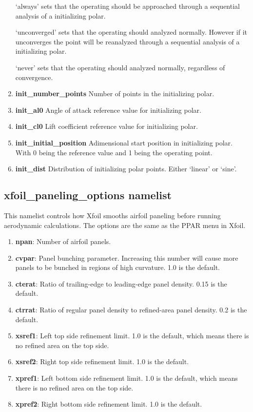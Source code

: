 \documentclass[11pt]{article}
\begin{document}
\begin{enumerate}
{	`always' sets that the operating should be approached through a sequential analysis of a initializing polar.
	
	`unconverged' sets that the operating should analyzed normally. However if it unconverges the point will be reanalyzed through a sequential analysis of a initializing polar.
	
	`never' sets that the operating should analyzed normally, regardless of convergence.}

\item{\textbf{init\_number\_points} Number of points in the initializing polar.}
\item{\textbf{init\_al0} Angle of attack reference value for initializing polar.}
\item{\textbf{init\_cl0} Lift coefficient reference value for initializing polar.}
\item{\textbf{init\_initial\_position} Adimensional start position in initializing polar. With 0 being the reference value and 1 being the operating point.}
\item{\textbf{init\_dist} Distribution of initializing polar points. Either `linear' or `sine'.}
\end{enumerate}

\subsection{xfoil\_paneling\_options namelist}

This namelist controls how Xfoil smooths airfoil paneling before running aerodynamic
calculations.  The options are the same as the PPAR menu in Xfoil.

\begin{enumerate}
\item{\textbf{npan}: Number of airfoil panels.}
\item{\textbf{cvpar}: Panel bunching parameter.  Increasing this number will cause more
panels to be bunched in regions of high curvature. 1.0 is the default.}
\item{\textbf{cterat}: Ratio of trailing-edge to leading-edge panel density.  0.15 is the
default.}
\item{\textbf{ctrrat}: Ratio of regular panel density to refined-area panel density.  0.2
is the default.}
\item{\textbf{xsref1}: Left top side refinement limit.  1.0 is the default, which means
there is no refined area on the top side.}
\item{\textbf{xsref2}: Right top side refinement limit.  1.0 is the default.}
\item{\textbf{xpref1}: Left bottom side refinement limit.  1.0 is the default, which means
there is no refined area on the top side.}
\item{\textbf{xpref2}: Right bottom side refinement limit.  1.0 is the default.}
\end{enumerate}
\end{document}
